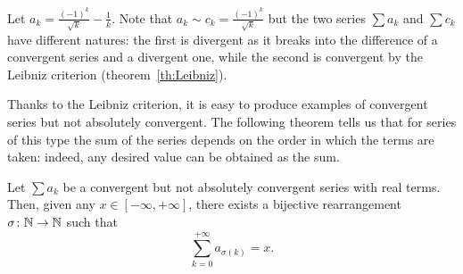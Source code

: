 \begin{example}
Let $a_k = \frac{(-1)^k}{\sqrt k} - \frac{1}{k}$.
Note that $a_k \sim c_k = \frac{(-1)^k}{\sqrt k}$
but the two series $\sum a_k$ and $\sum c_k$ have different natures:
the first is divergent as it breaks into the difference 
of a convergent series and a divergent one,
while the second is convergent by the Leibniz criterion
(theorem~\ref{th:Leibniz}).
\end{example}

Thanks to the Leibniz criterion, it is easy 
to produce examples of convergent series
but not absolutely convergent.
The following theorem tells us that for series of this type 
the sum of the series depends on the order in which the terms are taken:
indeed, any desired value can be obtained as the sum.

\begin{theorem}%
\label{th:convergenza_condizionata}%
%
%
Let $\sum a_k$ be a convergent but not absolutely convergent series with real
terms.
Then, given any $x \in [-\infty , +\infty]$, there exists a bijective
rearrangement
$\sigma \colon {\mathbb N} \to {\mathbb N}$ such that
\[
  \sum_{k=0}^{+\infty}  a_{\sigma(k)} = x.
\]
\end{theorem}
%
